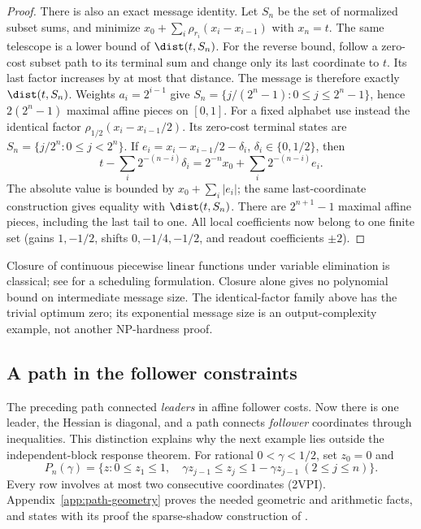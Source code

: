 \begin{proof}
There is also an exact message identity. Let \(S_n\) be the set of normalized
subset sums, and minimize \(x_0+\sum_i\rho_{r_i}(x_i-x_{i-1})\) with \(x_n=t\).
The same telescope is a lower bound of \(\dist(t,S_n)\). For the reverse bound,
follow a zero-cost subset path to its terminal sum and change only its last
coordinate to \(t\). Its last factor increases by at most that distance.
The message is therefore exactly \(\dist(t,S_n)\). Weights \(a_i=2^{i-1}\)
give \(S_n=\{j/(2^n-1):0\le j\le2^n-1\}\), hence \(2(2^n-1)\) maximal
affine pieces on \([0,1]\).
For a fixed alphabet use instead the identical factor
\(\rho_{1/2}(x_i-x_{i-1}/2)\). Its zero-cost terminal states are
\(S_n=\{j/2^n:0\le j<2^n\}\). If \(e_i=x_i-x_{i-1}/2-\delta_i\),
\(\delta_i\in\{0,1/2\}\), then
\[
 t-\sum_i2^{-(n-i)}\delta_i
 =2^{-n}x_0+\sum_i2^{-(n-i)}e_i.
\]
The absolute value is bounded by \(x_0+\sum_i|e_i|\); the same last-coordinate
construction gives equality with \(\dist(t,S_n)\). There are
\(2^{n+1}-1\) maximal affine pieces, including the last tail to one.
All local coefficients now belong to one finite set (gains \(1,-1/2\), shifts
\(0,-1/4,-1/2\), and readout coefficients \(\pm2\)).
\end{proof}
Closure of continuous piecewise linear functions under variable elimination
is classical; see \citet[Lemmas~1--2 and Theorem~1]{MeuleauEtAl2008} for a
scheduling formulation. Closure alone gives no polynomial bound on intermediate
message size. The identical-factor family above has the trivial optimum zero;
its exponential message size is an output-complexity example, not another
NP-hardness proof.

\subsection{A path in the follower constraints}
\label{subsec:follower-path}
The preceding path connected \emph{leaders} in affine follower costs. Now there
is one leader, the Hessian is diagonal, and a path connects \emph{follower}
coordinates through inequalities. This distinction explains why the next
example lies outside the independent-block response theorem.
For rational \(0<\gamma<1/2\), set \(z_0=0\) and
\begin{equation}\label{eq:klee-polytope}
 P_n(\gamma)=\{z:0\le z_1\le1,\quad
          \gamma z_{j-1}\le z_j\le1-\gamma z_{j-1}\ (2\le j\le n)\}.
\end{equation}
Every row involves at most two consecutive coordinates (2VPI).
Appendix~\ref{app:path-geometry} proves the needed geometric and arithmetic
facts, and states with its proof the sparse-shadow construction of
\citet[Section~4]{GartnerEtAl2013}.

